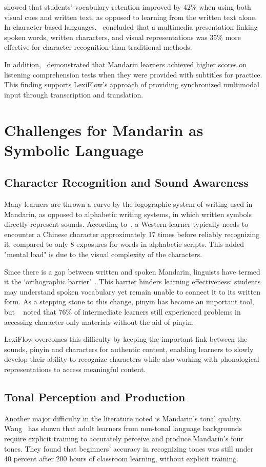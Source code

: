 \documentclass[oneside]{utmthesis}
\begin{document}
\citet{jones2002} showed that students' vocabulary retention improved by 42\% when using both visual cues and written text, as opposed to learning from the written text alone. In character-based languages,~\citet{shen2010} concluded that a multimedia presentation linking spoken words, written characters, and visual representations was 35\% more effective for character recognition than traditional methods.

In addition,~\cite{li2022} demonstrated that Mandarin learners achieved higher scores on listening comprehension tests when they were provided with subtitles for practice. This finding supports LexiFlow's approach of providing synchronized multimodal input through transcription and translation.

\section{Challenges for Mandarin as Symbolic Language}
\subsection{Character Recognition and Sound Awareness}
Many learners are thrown a curve by the logographic system of writing used in Mandarin, as opposed to alphabetic writing systems, in which written symbols directly represent sounds. According to~\citet{everson2011}, a Western learner typically needs to encounter a Chinese character approximately 17 times before reliably recognizing it, compared to only 8 exposures for words in alphabetic scripts. This added "mental load" is due to the visual complexity of the characters.

Since there is a gap between written and spoken Mandarin, linguists have termed it the `orthographic barrier'~\citep{shen2007}. This barrier hinders learning effectiveness: students may understand spoken vocabulary yet remain unable to connect it to its written form. As a stepping stone to this change, pinyin has become an important tool, but ~\citet{ye2013} noted that 76\% of intermediate learners still experienced problems in accessing character-only materials without the aid of pinyin.

LexiFlow overcomes this difficulty by keeping the important link between the sounds, pinyin and characters for authentic content, enabling learners to slowly develop their ability to recognize characters while also working with phonological representations to access meaningful content.

\subsection{Tonal Perception and Production}
Another major difficulty in the literature noted is Mandarin's tonal quality. Wang~\cite{wang1999} has shown that adult learners from non-tonal language backgrounds require explicit training to accurately perceive and produce Mandarin's four tones. They found that beginners' accuracy in recognizing tones was still under 40 percent after 200 hours of classroom learning, without explicit training.
\end{document}
